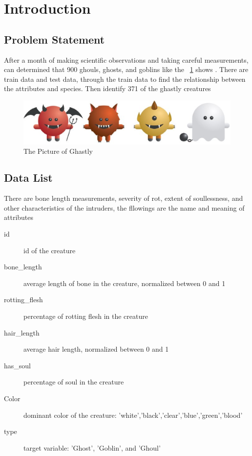
\section{Introduction}\label{sec-intro}

\subsection{Problem Statement}


After a month of making scientific observations 
and taking careful measurements, 
can determined that 900 ghouls, ghosts, and goblins
like the ~\cref{fig:animal} shows .
There are train data and test data,
through the train data to find the relationship
between the attributes and species.
Then identify 371 of the ghastly creatures


\begin{figure}[htbp]
	\centering
	\label{fig:animal}
	\includegraphics[scale=0.3]{figures/bar.eps}
	\caption{The Picture of Ghastly}
\end{figure}


\subsection{Data List}


There are bone length measurements, 
severity of rot, extent of soullessness, 
and other characteristics of the intruders,
the fllowings are the  
name and meaning of attributes


\begin{description}
	\item[id] id of the creature
	\item[bone_length] average length of bone in the creature, normalized between 0 and 1
	\item[rotting_flesh] percentage of rotting flesh in the creature
	\item[hair_length] average hair length, normalized between 0 and 1
	\item[has_soul] percentage of soul in the creature
	\item[Color] dominant color of the creature: 'white','black','clear','blue','green','blood'
	\item[type] target variable: 'Ghost', 'Goblin', and 'Ghoul'
\end{description}


